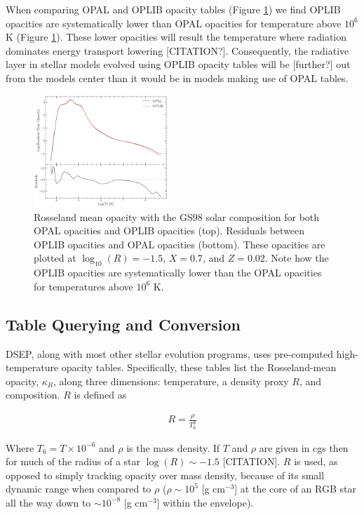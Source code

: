 When comparing OPAL and OPLIB opacity tables (Figure \ref{fig:opacComp}) we
find OPLIB opacities are systematically lower than OPAL opacities for
temperature above $10^{6}$ K (Figure \ref{fig:opacComp}). These lower opacities
will result the temperature where radiation dominates energy transport lowering
{\color{red} [CITATION?]}. Consequently, the radiative layer in stellar models
evolved using OPLIB opacity tables will be {\color{red} [further?]} out from
the models center than it would be in models making use of OPAL tables.

\begin{figure}
	\centering
	\includegraphics[width=0.45\textwidth]{src/figures/OpacityComparision.pdf}
	\caption{Rosseland mean opacity with the GS98 solar composition for both
	OPAL opacities and OPLIB opacities (top). Residuals between OPLIB opacities
	and OPAL opacities (bottom). These opacities are plotted at $\log _{10}(R)
	= -1.5$, $X=0.7$, and $Z=0.02$. Note how the OPLIB opacities are
	systematically lower than the OPAL opacities for temperatures above $10^6$
	K.}
	\label{fig:opacComp}
\end{figure}

\subsection{Table Querying and Conversion}
DSEP, along with most other stellar evolution programs, uses pre-computed
high-temperature opacity tables. Specifically, these tables list the
Rosseland-mean opacity, $\kappa_{R}$, along three dimensions: temperature, a
density proxy $R$, and composition. $R$ is defined as

\begin{align} \label{eqn:Req}
	R = \frac{\rho}{T_{6}^{3}}
\end{align}

Where $T_{6} = T\times10^{-6}$ and $\rho$ is the mass density. If $T$ and
$\rho$ are given in cgs then for much of the radius of a star $\log(R)\sim-1.5$
{\color{red}[CITATION]}.  $R$ is used, as opposed to simply tracking opacity
over mass density, because of its small dynamic range when compared to $\rho$ ($\rho\sim
10^{5}$ [g cm$^{-3}$] at the core of an RGB star all the way down to $\sim
10^{-8}$ [g cm$^{-3}$] within the envelope). 

